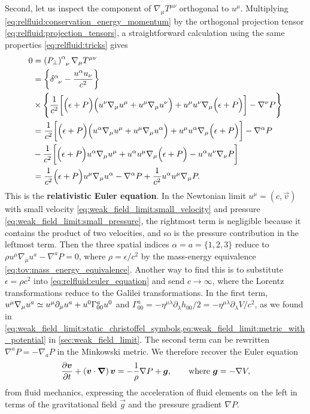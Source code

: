 Second, let us inspect the component of $\nabla_\mu T^{\mu \nu}$ orthogonal to $u^\mu$.
Multiplying \cref{eq:relfluid:conservation_energy_momentum} by the orthogonal projection tensor \eqref{eq:relfluid:projection_tensors},
a straightforward calculation using the same properties \eqref{eq:relfluid:tricks} gives
\begin{align}
	0 &=      \left(P_\perp\right)\indices{^\alpha_\nu} \nabla_\mu T^{\mu \nu} \nonumber \\
	  &=      \left\{ \delta\indices{^\alpha_\nu} - \frac{u^\alpha u_\nu}{c^2} \right\} \nonumber \\
	  &\times \Bigg \{ \frac{1}{c^2} \bigg[ \Big( \epsilon + P \Big) \Big( u^\nu \nabla_\mu u^\mu + u^\mu \nabla_\mu u^\nu \Big) + u^\mu u^\nu \nabla_\mu \Big( \epsilon + P \Big) \bigg] - \nabla^\nu P \Bigg\} \nonumber \\
	  &=      \frac{1}{c^2} \bigg[ \Big( \epsilon + P \Big) \Big( u^\alpha \nabla_\mu u^\mu + u^\mu \nabla_\mu u^\alpha \Big) + u^\mu u^\alpha \nabla_\mu \Big( \epsilon + P \Big) \bigg] - \nabla^\alpha P \nonumber \\
	  &-      \frac{1}{c^2} \bigg[ \Big( \epsilon + P \Big) u^\alpha \nabla_\mu u^\mu + u^\alpha u^\mu \nabla_\mu \Big( \epsilon + P \Big) - u^\alpha u^\nu \nabla_\nu P \bigg] \nonumber \\
	  &=      \frac{1}{c^2} \Big( \epsilon + P \Big) u^\mu \nabla_\mu u^\alpha - \nabla^\alpha P + \frac{1}{c^2} u^\alpha u^\mu \nabla_\mu P . \label{eq:relfluid:euler_equation}
\end{align}
This is the \textbf{relativistic Euler equation}. 
In the Newtonian limit $u^\mu = (c, \vec{v})$ with small velocity \eqref{eq:weak_field_limit:small_velocity} and pressure \eqref{eq:weak_field_limit:small_pressure}, the rightmost term is negligible because it contains the product of two velocities, and so is the pressure contribution in the leftmost term.
Then the three spatial indices $\alpha = a = \{1, 2, 3\}$ reduce to $\rho u^\mu \nabla_\mu u^a - \nabla^a P = 0$, where $\rho = \epsilon / c^2$ by the mass-energy equivalence \eqref{eq:tov:mass_energy_equivalence}.
Another way to find this is to substitute $\epsilon = \rho c^2$ into \cref{eq:relfluid:euler_equation} and send $c \rightarrow \infty$, where the Lorentz transformations reduce to the Galilei transformations.
In the first term, $u^\mu \nabla_\mu u^a \simeq u^\mu \partial_\mu u^a + u^0 \Gamma^a_{00} u^0$ and $\Gamma^a_{00} = -\eta^{\mu \lambda} \partial_\lambda h_{00} / 2 = -\eta^{\mu \lambda} \partial_\lambda V / c^2$, as we found in \cref{eq:weak_field_limit:static_christoffel_symbols,eq:weak_field_limit:metric_with_potential} in \cref{sec:weak_field_limit}.
The second term can be rewritten $\nabla^a P = -\nabla_a P$ in the Minkowski metric.
We therefore recover the Euler equation
\cite[equation 4.3]{ref:iver}
\begin{equation}
	\pdv{{\bm{v}}}{t} + \left( {\bm{v}} \cdot {\bm{\nabla}} \right) {\bm{v}} = -\frac{1}{\rho} \nabla P + {\bm{g}} ,
	\qquad \text{where } {\bm{g}} = -\nabla V ,
\end{equation}
from fluid mechanics, expressing the acceleration of fluid elements on the left in terms of the gravitational field $\vec{g}$ and the pressure gradient $\nabla P$.


